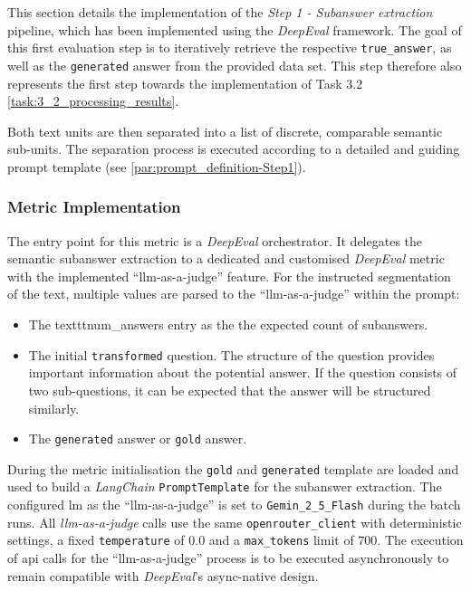 This section details the implementation of the \textit{Step 1 - Subanswer extraction} pipeline, which has been implemented using the \textit{DeepEval} framework.
The goal of this first evaluation step is to iteratively retrieve the respective \texttt{true\_answer}, as well as the \texttt{generated} answer from the provided data set.
This step therefore also represents the first step towards the implementation of Task $3.2$ \cref{task:3_2_processing_results}.

Both text units are then separated into a list of discrete, comparable semantic sub-units.
The separation process is executed according to a detailed and guiding prompt template (see \cref{par:prompt_definition-Step1}).
%
\subsubsection{Metric Implementation}\label{subsub:metric_impl_Step1}

The entry point for this metric is a \textit{DeepEval} orchestrator.
It delegates the semantic subanswer extraction to a dedicated and customised \textit{DeepEval} metric with the implemented \enquote{llm-as-a-judge} feature.
For the instructed segmentation of the text, multiple values are parsed to the \enquote{llm-as-a-judge} within the prompt:
\begin{itemize}
    \item The texttt{num\_answers} entry as the the expected count of subanswers.
    \item The initial \texttt{transformed} question.
    The structure of the question provides important information about the potential answer.
    If the question consists of two sub-questions, it can be expected that the answer will be structured similarly.
    \item The \texttt{generated} answer or \texttt{gold} answer. 
\end{itemize}
%
During the metric initialisation the \texttt{gold} and \texttt{generated} template are loaded and used to build a \textit{LangChain} \texttt{PromptTemplate} for the subanswer extraction.
The configured \ac{lm} as the \enquote{llm-as-a-judge} is set to \texttt{Gemin\_2\_5\_Flash} during the batch runs.
%
All \textit{llm-as-a-judge} calls use the same \texttt{openrouter\_client} with deterministic settings, a fixed \texttt{temperature} of $0.0$ and a \texttt{max\_tokens} limit of $700$.
The execution of \ac{api} calls for the \enquote{llm-as-a-judge} process is to be executed asynchronously to remain compatible with \textit{DeepEval}'s async-native design.
%
